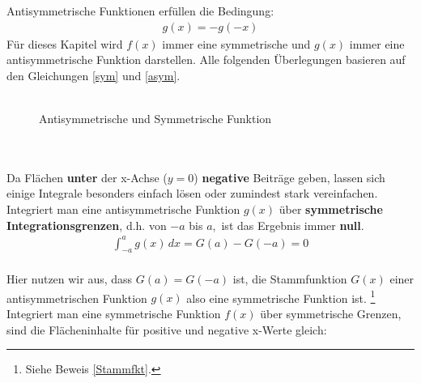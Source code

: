 Antisymmetrische Funktionen erfüllen die Bedingung:
\begin{align}
g(x) = -g(-x)
\label{asym}
\end{align}
Für dieses Kapitel wird $f(x)$ immer eine symmetrische und $g(x)$ immer eine antisymmetrische Funktion darstellen. Alle folgenden Überlegungen basieren auf den Gleichungen \ref{sym} und \ref{asym}. \\
\\
\begin{figure}[h]
\caption{Antisymmetrische und Symmetrische Funktion}
\label{SymAndAnti}
\end{figure}\\
\\
Da Flächen \textbf{unter} der x-Achse ($y=0$) \textbf{negative} Beiträge geben, lassen sich einige Integrale besonders einfach lösen oder zumindest stark vereinfachen. Integriert man eine antisymmetrische Funktion $g(x)$ über \textbf{symmetrische Integrationsgrenzen}, d.h. von $-a$ bis $a$, \,ist das Ergebnis immer \textbf{null}.\\
\begin{align}
\int_{-a}^a g(x) \, dx = G(a) - G(-a) = 0
\end{align}\\
Hier nutzen wir aus, dass $G(a)=G(-a)$ ist, die Stammfunktion $G(x)$ einer antisymmetrischen Funktion $g(x)$ also eine symmetrische Funktion ist.
\footnote{Siehe Beweis \ref{Stammfkt}.}\\
Integriert man eine symmetrische Funktion $f(x)$ über symmetrische Grenzen, sind die Flächeninhalte für positive und negative x-Werte gleich:\\
